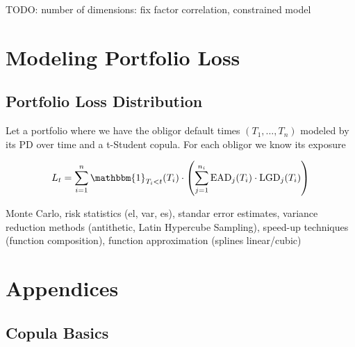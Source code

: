 \documentclass[11pt,fleqn]{book} %
\begin{document}
\begin{example}
\end{example}

TODO: number of dimensions: fix factor correlation, constrained model \cite{roncalli:2004}

\chapter{Modeling Portfolio Loss}

\section{Portfolio Loss Distribution}

Let a portfolio where we have the obligor default times
$(T_1,\dots,T_n)$ modeled by its PD over time and a
t-Student copula. For each obligor we know its exposure

\begin{displaymath}
	L_t = \displaystyle \sum_{i=1}^n \mathbbm{1}_{T_i < t}(T_i) \cdot 
	\left( 
	\sum_{j=1}^{n_i} \text{EAD}_j(T_i) \cdot \text{LGD}_j(T_i)
	\right)
\end{displaymath}

Monte Carlo, risk statistics (el, var, es), standar error estimates,
variance reduction methods (antithetic, Latin Hypercube Sampling),
speed-up techniques (function composition), function approximation
(splines linear/cubic)


\appendix
{}
\chapter{Appendices}

\section{Copula Basics}
\label{ap:copula_basics}
\end{document}
